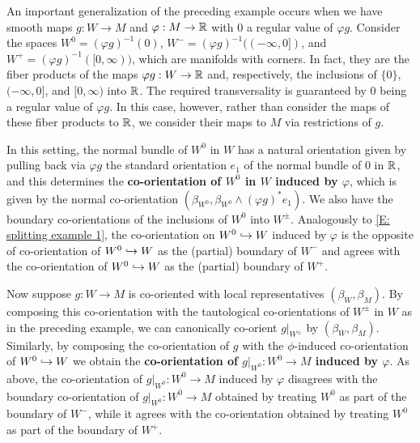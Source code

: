 \begin{example}\label{E: manifold decomposition}
	An important generalization of the preceding example occurs when we have smooth maps $g \colon W \to M$ and $\varphi:M\to \mathbb{R}$ with $0$ a regular value of $\varphi g$.
	Consider the spaces $W^0=(\varphi g)^{-1}(0)$, $W^-=(\varphi g)^{-1}((-\infty,0])$, and $W^+=(\varphi g)^{-1}([0,\infty))$, which are manifolds with corners.
	In fact, they are the fiber products of the maps $\varphi g:W\to \mathbb{R}$ and, respectively, the inclusions of $\{0\}$, $(-\infty, 0]$, and $[0,\infty)$ into $\mathbb{R}$.
	The required transversality is guaranteed by $0$ being a regular value of $\varphi g$.
	In this case, however, rather than consider the maps of these fiber products to $\mathbb{R}$, we consider their maps to $M$ via restrictions of $g$.

	In this setting, the normal bundle of $W^0$ in $W$ has a natural orientation given by pulling back via $\varphi g$ the standard orientation $e_1$ of the normal bundle of $0$ in $\mathbb{R}$, and this determines the \textbf{co-orientation of $W^0$ in $W$ induced by $\varphi$}, which is given by the normal co-orientation $(\beta_{W^0}, \beta_{W^0} \wedge(\varphi g)^*e_1)$.
	We also have the boundary co-orientations of the inclusions of $W^0$ into $W^{\pm}$.
	Analogously to \cref{E: splitting example 1}, the co-orientation on $W^0\hookrightarrow W$ induced by $\varphi$ is the opposite of co-orientation of $W^0\hookrightarrow W$ as the (partial) boundary of $W^-$ and agrees with the co-orientation of $W^0\hookrightarrow W$ as the (partial) boundary of $W^+$.

	Now suppose $g \colon W \to M$ is co-oriented with local representatives $(\beta_W,\beta_M)$.
	By composing this co-orientation with the tautological co-orientations of $W^\pm$ in $W$ as in the preceding example, we can canonically co-orient $g|_{W^\pm}$ by $(\beta_W,\beta_M)$.
	Similarly, by composing the co-orientation of $g$ with the $\phi$-induced co-orientation of $W^0\hookrightarrow W$ we obtain the \textbf{co-orientation of $g|_{W^0}:W^0\to M$ induced by $\varphi$}.
	As above, the co-orientation of $g|_{W^0}:W^0\to M$ induced by $\varphi$ disagrees with the boundary co-orientation of $g|_{W^0}:W^0\to M$ obtained by treating $W^0$ as part of the boundary of $W^-$, while it agrees with the co-orientation obtained by treating $W^0$ as part of the boundary of $W^+$.


\end{example}
